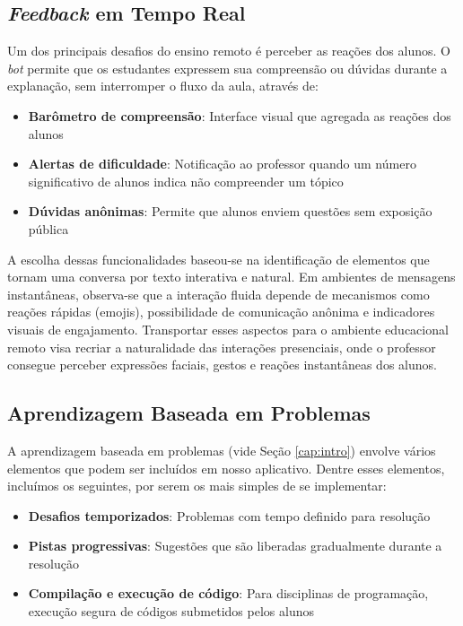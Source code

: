 \subsection{\textit{Feedback} em Tempo Real}
\label{subsec:feedback}

Um dos principais desafios do ensino remoto é perceber as reações dos alunos. O
\textit{bot} permite que os estudantes expressem sua compreensão ou dúvidas
durante a explanação, sem interromper o fluxo da aula, através de:

\begin{itemize}
\item \textbf{Barômetro de compreensão}: Interface visual que agregada as
reações dos alunos
\item \textbf{Alertas de dificuldade}: Notificação ao professor quando um número
significativo de alunos indica não compreender um tópico
\item \textbf{Dúvidas anônimas}: Permite que alunos enviem questões sem
exposição pública
\end{itemize}

A escolha dessas funcionalidades baseou-se na identificação de elementos que
tornam uma conversa por texto interativa e natural. Em ambientes de mensagens
instantâneas, observa-se que a interação fluida depende de mecanismos como
reações rápidas (emojis), possibilidade de comunicação anônima e indicadores
visuais de engajamento. Transportar esses aspectos para o ambiente educacional
remoto visa recriar a naturalidade das interações presenciais, onde o professor
consegue perceber expressões faciais, gestos e reações instantâneas dos
alunos\cite{huang2021}.

\subsection{Aprendizagem Baseada em Problemas}
\label{subsec:pbl}

A aprendizagem baseada em problemas (vide Seção \ref{cap:intro}) envolve vários
elementos que podem ser incluídos em nosso aplicativo. Dentre esses elementos,
incluímos os seguintes, por serem os mais simples de se implementar:

\begin{itemize}
\item \textbf{Desafios temporizados}: Problemas com tempo definido para
resolução
\item \textbf{Pistas progressivas}: Sugestões que são liberadas gradualmente
durante a resolução
\item \textbf{Compilação e execução de código}: Para disciplinas de programação,
execução segura de códigos submetidos pelos alunos
\end{itemize}

